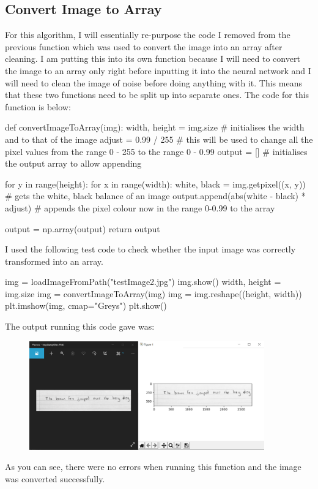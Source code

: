 \documentclass{report}
\begin{document}
\subsection{Convert Image to Array}
For this algorithm, I will essentially re-purpose the code I removed from the previous function which was used to convert the image into an array after cleaning. I am putting this into its own function because I will need to convert the image to an array only right before inputting it into the neural network and I will need to clean the image of noise before doing anything with it. This means that these two functions need to be split up into separate ones. The code for this function is below:
\begin{python}
def convertImageToArray(img):
    width, height = img.size  # initialises the width and to that of the image
    adjust = 0.99 / 255  # this will be used to change all the pixel values from the range 0 - 255 to the range 0 - 0.99
    output = []  # initialises the output array to allow appending

    for y in range(height):
        for x in range(width):
            white, black = img.getpixel((x, y))  # gets the white, black balance of an image
            output.append(abs(white - black) * adjust)  # appends the pixel colour now in the range 0-0.99 to the array

    output = np.array(output)
    return output
\end{python}
I used the following test code to check whether the input image was correctly transformed into an array.
\begin{python}
img = loadImageFromPath("testImage2.jpg")
img.show()
width, height = img.size
img = convertImageToArray(img)
img = img.reshape((height, width))
plt.imshow(img, cmap="Greys")
plt.show()
\end{python}
The output running this code gave was:
\begin{figure}[H]
    \centering
    \includegraphics[width=4in]{Images/Development and Testing/Stage 4/Testing For Convert Image To Array/Test 1.png}
    \label{fig:Convert Image To Array: Test 1}
\end{figure}
\noindent As you can see, there were no errors when running this function and the image was converted successfully.
\end{document}
